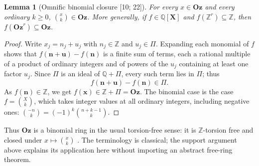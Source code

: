 \documentclass[11pt,letterpaper]{article}
\numberwithin{equation}{section}
\newtheorem{lemma}[lemma]{Lemma}
\theoremstyle{definition}
\theoremstyle{remark}
\theoremstyle{plain}
\newcommand{\Oz}{\mathbf{Oz}}
\newcommand{\Z}{\mathbb Z}
\newcommand{\Q}{\mathbb Q}
\newcommand{\src}[1]{\textup{\textsf{[#1]}}}
\begin{document}
\begin{lemma}[Omnific binomial closure \src{10; 22}]\label{osq:pm:lem:binomial}
For every $x\in\Oz$ and every ordinary $k\ge0$, $\binom xk\in\Oz$. More generally, if
$f\in\Q[\mathbf X]$ and $f(\Z^r)\subseteq\Z$, then $f(\Oz^r)\subseteq\Oz$.
\end{lemma}
\begin{proof}
Write $x_j=n_j+u_j$ with $n_j\in\Z$ and $u_j\in\Pi$. Expanding each monomial of $f$ shows
that $f(\mathbf n+\mathbf u)-f(\mathbf n)$ is a finite sum of terms, each a rational
multiple of a product of ordinary integers and of powers of the $u_j$ containing at least
one factor $u_j$. Since $\Pi$ is an ideal of $\Q+\Pi$, every such term lies in $\Pi$; thus
\[
 f(\mathbf n+\mathbf u)-f(\mathbf n)\in\Pi .
\]
As $f(\mathbf n)\in\Z$, we get $f(\mathbf x)\in\Z+\Pi=\Oz$. The binomial case is the
case $f=\binom Xk$, which takes integer values at all ordinary integers, including
negative ones: $\binom{-n}{k}=(-1)^k\binom{n+k-1}{k}$.
\end{proof}

Thus $\Oz$ is a binomial ring in the usual torsion-free sense: it is $\Z$-torsion free and
closed under $x\mapsto\binom xk$ \cite{ElliottBinomial}. The terminology is classical; the
support argument above explains its application here without importing an abstract
free-ring theorem.
\end{document}
